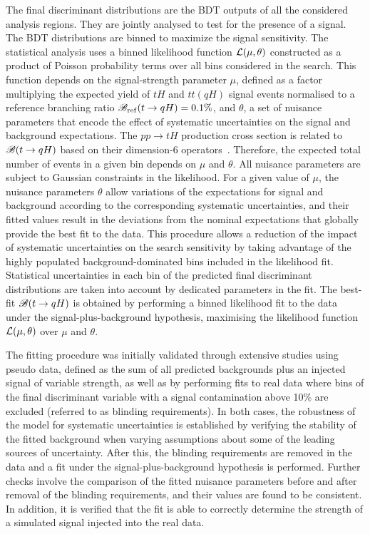 \documentclass[PAPER, coverpage, atlasdraft=true, texlive=2016, UKenglish]{\ATLASLATEXPATH atlasdoc} %
\begin{document}
The final discriminant distributions are the BDT outputs of all the considered analysis regions. They are jointly analysed to test for the 
presence of a signal. The BDT distributions are binned to maximize the signal sensitivity.
The statistical analysis uses a binned likelihood function ${\cal L}(\mu,\theta)$ constructed as
a product of Poisson probability terms over all bins considered in the search. This function depends
on the signal-strength parameter $\mu$, defined as a factor multiplying the expected yield of $tH$ and $tt(qH)$ signal events
normalised to a reference branching ratio $\mathscr{B}_{\mathrm{ref}}(t\to qH)=0.1\%$,
and $\theta$, a set of nuisance parameters that encode the effect of systematic uncertainties on the signal and background expectations.
The $pp\rightarrow tH$ production cross section is related to $\mathscr{B}(t\rightarrow qH)$ based on their dimension-6 operators~\cite{fcnc_production_theory}.
Therefore, the expected total number of events in a given bin depends on $\mu$ and $\theta$. 
All nuisance parameters are subject to Gaussian constraints in the likelihood.
For a given value of $\mu$, the nuisance parameters $\theta$ allow variations of the expectations for signal and background
according to the corresponding systematic uncertainties, and their fitted values result in the deviations from
the nominal expectations that globally provide the best fit to the data.
This procedure allows a reduction of the impact of systematic uncertainties on 
the search sensitivity by taking advantage of the highly populated background-dominated bins included in the likelihood fit.
Statistical uncertainties in each bin of the predicted final discriminant distributions are taken into account by dedicated parameters in the fit.     
The best-fit $\mathscr{B}(t\to qH)$ is obtained by performing a binned likelihood fit to the data under the signal-plus-background
hypothesis, maximising the likelihood function ${\cal L}(\mu,\theta)$ over $\mu$ and $\theta$.

The fitting procedure was initially validated through extensive studies using pseudo data, defined as the sum of all predicted backgrounds 
plus an injected signal of variable strength, as well as by performing fits to real data where bins of the final discriminant variable with 
a signal contamination above 10\% are excluded (referred to as blinding requirements).
In both cases, the robustness of the model for systematic uncertainties is established by verifying the stability of the fitted background 
when varying assumptions about some of the leading sources of uncertainty. 
After this, the blinding requirements
are removed in the data and a fit under the signal-plus-background hypothesis is performed. Further checks involve the comparison of the fitted 
nuisance parameters before and after removal of the blinding requirements, and their values are found to be consistent. In addition, it is verified that the 
fit is able to correctly determine the strength of a simulated signal injected into the real data.
\end{document}
